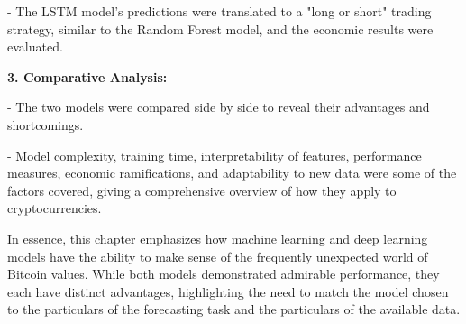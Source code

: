 -	The LSTM model's predictions were translated to a "long or short" trading strategy, similar to the Random Forest model, and the economic results were evaluated.

\textbf{3.	Comparative Analysis:}

-	The two models were compared side by side to reveal their advantages and shortcomings.

-	Model complexity, training time, interpretability of features, performance measures, economic ramifications, and adaptability to new data were some of the factors covered, giving a comprehensive overview of how they apply to cryptocurrencies.

In essence, this chapter emphasizes how machine learning and deep learning models have the ability to make sense of the frequently unexpected world of Bitcoin values. While both models demonstrated admirable performance, they each have distinct advantages, highlighting the need to match the model chosen to the particulars of the forecasting task and the particulars of the available data.


\def\baselinestretch{1.66}
\medskip

